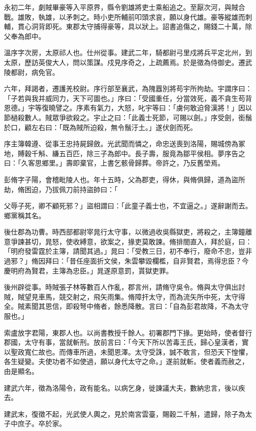 \begin{pinyinscope}
永初二年，劇賊畢豪等入平原界，縣令劉雄將吏士乘船追之。至厭次河，與賊合戰。雄敗，執雄，以矛刺之。時小吏所輔前叩頭求哀，願以身代雄。豪等縱雄而刺輔，貫心洞背即死。東郡太守捕得豪等，具以狀上。詔書追傷之，賜錢二十萬，除父奉為郎中。

溫序字次房，太原祁人也。仕州從事。建武二年，騎都尉弓里戍將兵平定北州，到太原，歷訪英俊大人，問以策謀。戍見序奇之，上疏薦焉。於是徵為侍御史。遷武陵都尉，病免官。

六年，拜謁者，遷護羌校尉。序行部至襄武，為隗囂別將苟宇所拘劫。宇謂序曰：「子若與我并威同力，天下可圖也。」序曰：「受國重任，分當效死，義不貪生苟背恩德。」宇等復曉譬之。序素有氣力，大怒，叱宇等曰：「虜何敢迫脅漢將！」因以節檛殺數人。賊眾爭欲殺之。宇止之曰：「此義士死節，可賜以劍。」序受劍，銜鬚於口，顧左右曰：「既為賊所迫殺，無令鬚汙土。」遂伏劍而死。

序主簿韓遵、從事王忠持屍歸斂。光武聞而憐之，命忠送喪到洛陽，賜城傍為冢地，賻穀千斛、縑五百匹，除三子為郎中。長子壽，服竟為鄒平侯相。夢序告之曰：「久客思鄉里。」壽即棄官，上書乞骸骨歸葬。帝許之，乃反舊塋焉。

彭脩字子陽，會稽毗陵人也。年十五時，父為郡吏，得休，與脩俱歸，道為盜所劫，脩困迫，乃拔佩刀前持盜帥曰：「

父辱子死，卿不顧死邪？」盜相謂曰：「此童子義士也，不宜逼之。」遂辭謝而去。鄉黨稱其名。

後仕郡為功曹。時西部都尉宰晁行太守事，以微過收吳縣獄吏，將殺之，主簿鐘離意爭諫甚切，晁怒，使收縛意，欲案之，掾吏莫敢諫。脩排閤直入，拜於庭，曰：「明府發雷霆於主簿，請聞其過。」晁曰：「受教三日，初不奉行，廢命不忠，豈非過邪？」脩因拜曰：「昔任座面折文侯，朱雲攀毀欄檻，自非賢君，焉得忠臣？今慶明府為賢君，主簿為忠臣。」晁遂原意罰，貰獄吏罪。

後州辟從事。時賊張子林等數百人作亂，郡言州，請脩守吳令。脩與太守俱出討賊，賊望見車馬，競交射之，飛矢雨集。脩障扞太守，而為流矢所中死，太守得全。賊素聞其恩信，即殺弩中脩者，餘悉降散。言曰：「自為彭君故降，不為太守服也。」

索盧放字君陽，東郡人也。以尚書教授千餘人。初署郡門下掾。更始時，使者督行郡國，太守有事，當就斬刑。放前言曰：「今天下所以苦毒王氏，歸心皇漢者，實以聖政寬仁故也。而傳車所過，未聞恩澤。太守受誅，誠不敢言，但恐天下惶懼，各生疑變。夫使功者不如使過，願以身代太守之命。」遂前就斬。使者義而赦之，由是顯名。

建武六年，徵為洛陽令，政有能名。以病乞身，徙諫議大夫，數納忠言，後以疾去。

建武末，復徵不起，光武使人輿之，見於南宮雲臺，賜穀二千斛，遣歸，除子為太子中庶子。卒於家。


\end{pinyinscope}
